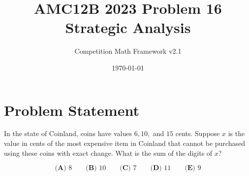 \documentclass[12pt]{article}
\begin{document}
\title{AMC12B 2023 Problem 16\\Strategic Analysis}
\author{Competition Math Framework v2.1}
\date{\today}
\maketitle

\section*{Problem Statement}

In the state of Coinland, coins have values $6, 10,$ and $15$ cents. Suppose $x$ is the value in cents of the most expensive item in Coinland that cannot be purchased using these coins with exact change. What is the sum of the digits of $x$?

$$\textbf{(A) } 8 \qquad \textbf{(B) } 10 \qquad \textbf{(C) } 7 \qquad \textbf{(D) } 11 \qquad \textbf{(E) } 9$$
\end{document}
